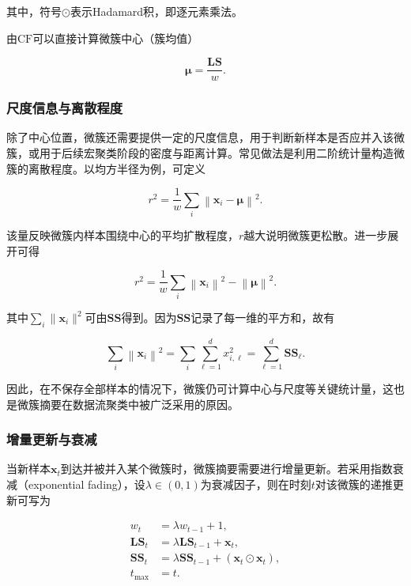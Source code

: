 \documentclass{xdupgthesis}
\begin{document}
其中，符号$\odot$表示Hadamard积，即逐元素乘法。

由$\mathrm{CF}$可以直接计算微簇中心（簇均值）

\begin{equation}
	\boldsymbol{\mu}=\frac{\mathbf{LS}}{w}.
\end{equation}



\subsubsection{尺度信息与离散程度}

除了中心位置，微簇还需要提供一定的尺度信息，用于判断新样本是否应并入该微簇，或用于后续宏聚类阶段的密度与距离计算。常见做法是利用二阶统计量构造微簇的离散程度。以均方半径为例，可定义

\begin{equation}
	r^2=\frac{1}{w}\sum_i\left\|\mathbf{x}_i-\boldsymbol{\mu}\right\|^2.
\end{equation}

该量反映微簇内样本围绕中心的平均扩散程度，$r$越大说明微簇更松散。进一步展开可得

\begin{equation}
	r^2=\frac{1}{w}\sum_i\left\|\mathbf{x}_i\right\|^2-\left\|\boldsymbol{\mu}\right\|^2.
\end{equation}

其中$\sum_i\|\mathbf{x}_i\|^2$可由$\mathbf{SS}$得到。因为$\mathbf{SS}$记录了每一维的平方和，故有

\begin{equation}
	\sum_i\left\|\mathbf{x}_i\right\|^2
	=\sum_i \sum_{\ell=1}^{d} x_{i,\ell}^2
	=\sum_{\ell=1}^{d} \mathbf{SS}_{\ell}.
\end{equation}

因此，在不保存全部样本的情况下，微簇仍可计算中心与尺度等关键统计量，这也是微簇摘要在数据流聚类中被广泛采用的原因。



\subsubsection{增量更新与衰减}

当新样本$\mathbf{x}_t$到达并被并入某个微簇时，微簇摘要需要进行增量更新。若采用指数衰减（exponential fading），设$\lambda\in(0,1)$为衰减因子，则在时刻$t$对该微簇的递推更新可写为

\begin{align}
	w_t &= \lambda w_{t-1}+1,\\
	\mathbf{LS}_t &= \lambda \mathbf{LS}_{t-1}+\mathbf{x}_t,\\
	\mathbf{SS}_t &= \lambda \mathbf{SS}_{t-1}+\left(\mathbf{x}_t\odot \mathbf{x}_t\right),\\
	t_{\max} &= t.
\end{align}
\end{document}
